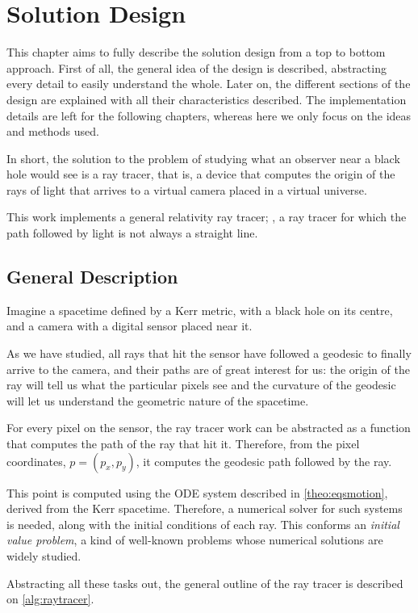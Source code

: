 \chapter{Solution Design}

This chapter aims to fully describe the solution design from a top to bottom approach. First of all, the general idea of the design is described, abstracting every detail to easily understand the whole. Later on, the different sections of the design are explained with all their characteristics described. The implementation details are left for the following chapters, whereas here we only focus on the ideas and methods used.

In short, the solution to the problem of studying what an observer near a black hole would see is a ray tracer, that is, a device that computes the origin of the rays of light that arrives to a virtual camera placed in a virtual universe.

This work implements a general relativity ray tracer; \ie, a ray tracer for which the path followed by light is not always a straight line.

\section{General Description}

Imagine a spacetime defined by a Kerr metric, with a black hole on its centre, and a camera with a digital sensor placed near it.

As we have studied, all rays that hit the sensor have followed a geodesic to finally arrive to the camera, and their paths are of great interest for us: the origin of the ray will tell us what the particular pixels see and the curvature of the geodesic will let us understand the geometric nature of the spacetime.

For every pixel on the sensor, the ray tracer work can be abstracted as a function that computes the path of the ray that hit it. Therefore, from the pixel coordinates, $p = (p_x, p_y)$, it computes the geodesic path followed by the ray.

This point is computed using the \ac{ODE} system described in \autoref{theo:eqsmotion}, derived from the Kerr spacetime. Therefore, a numerical solver for such systems is needed, along with the initial conditions of each ray. This conforms an \emph{initial value problem}, a kind of well-known problems whose numerical solutions are widely studied.

Abstracting all these tasks out, the general outline of the ray tracer is described on \autoref{alg:raytracer}.

